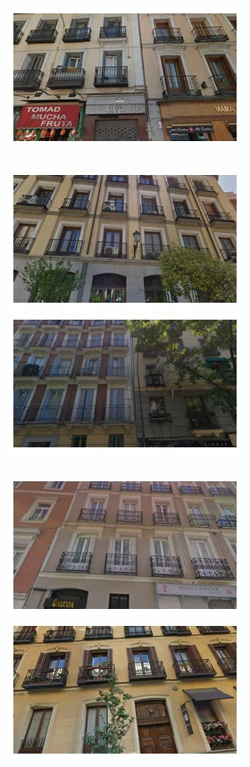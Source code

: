 \begin{figure}[t]
\begin{minipage}{\linewidth}
\begin{minipage}{0.3\linewidth}
      \includegraphics[width=0.49\linewidth]{imgs/arch/mosaicsS2/mosaic0005.jpg}
      \\ \vspace{-3mm} \\
      \includegraphics[width=0.49\linewidth]{imgs/arch/mosaicsS2/mosaic0006.jpg}
      \includegraphics[width=0.49\linewidth]{imgs/arch/mosaicsS2/mosaic0007.jpg}
      \\ \vspace{-3mm} \\
      \includegraphics[width=0.49\linewidth]{imgs/arch/mosaicsS2/mosaic0008.jpg}
      \includegraphics[width=0.49\linewidth]{imgs/arch/mosaicsS2/mosaic0009.jpg}

\end{minipage}
\end{minipage}
\end{figure}
